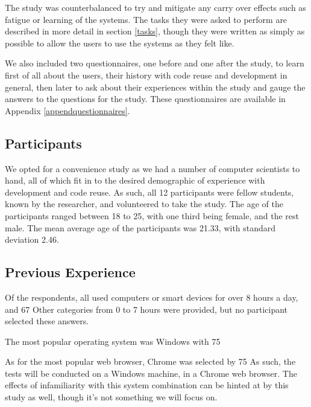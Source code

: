 The study was counterbalanced to try and mitigate any carry over effects such as fatigue or learning of the systems. 
The tasks they were asked to perform are described in more detail in section \ref{tasks}, though they were written as simply as possible to allow the users to use the systems as they felt like.

We also included two questionnaires, one before and one after the study, to learn first of all about the users, their history with code reuse and development in general, then later to ask about their experiences within the study and gauge the answers to the questions for the study.
These questionnaires are available in Appendix \ref{appendquestionnaires}.

\subsection{Participants} \label{participants}
We opted for a convenience study as we had a number of computer scientists to hand, all of which fit in to the desired demographic of experience with development and code reuse.
As such, all 12 participants were fellow students, known by the researcher, and volunteered to take the study.
The age of the participants ranged between 18 to 25, with one third being female, and the rest male.
The mean average age of the participants was 21.33, with standard deviation 2.46.

\subsection{Previous Experience} \label{prevex}
Of the respondents, all used computers or smart devices for over 8 hours a day, and 67%
Other categories from 0 to 7 hours were provided, but no participant selected these answers.

The most popular operating system was Windows with 75%

As for the most popular web browser, Chrome was selected by 75%
As such, the tests will be conducted on a Windows machine, in a Chrome web browser. 
The effects of infamiliarity with this system combination can be hinted at by this study as well, though it's not something we will focus on.

